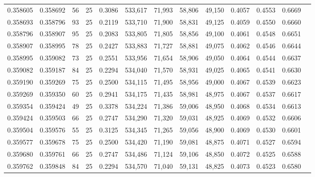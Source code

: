 \begin{tabular}{rrrrrrrrrrrrr}
0.358605 & 0.358692 &    56 &  25 &                                     0.3086 & 533,617 &  71,993 &  58,806 &  49,150 & 0.4057 & 0.4553 & 0.6669 \\
0.358693 & 0.358796 &    93 &  25 &                                     0.2119 & 533,710 &  71,900 &  58,831 &  49,125 & 0.4059 & 0.4550 & 0.6660 \\
0.358796 & 0.358907 &    95 &  25 &                                     0.2083 & 533,805 &  71,805 &  58,856 &  49,100 & 0.4061 & 0.4548 & 0.6651 \\
0.358907 & 0.358995 &    78 &  25 &                                     0.2427 & 533,883 &  71,727 &  58,881 &  49,075 & 0.4062 & 0.4546 & 0.6644 \\
0.358995 & 0.359082 &    73 &  25 &                                     0.2551 & 533,956 &  71,654 &  58,906 &  49,050 & 0.4064 & 0.4544 & 0.6637 \\
0.359082 & 0.359187 &    84 &  25 &                                     0.2294 & 534,040 &  71,570 &  58,931 &  49,025 & 0.4065 & 0.4541 & 0.6630 \\
0.359190 & 0.359269 &    75 &  25 &                                     0.2500 & 534,115 &  71,495 &  58,956 &  49,000 & 0.4067 & 0.4539 & 0.6623 \\
0.359269 & 0.359350 &    60 &  25 &                                     0.2941 & 534,175 &  71,435 &  58,981 &  48,975 & 0.4067 & 0.4537 & 0.6617 \\
0.359354 & 0.359424 &    49 &  25 &                                     0.3378 & 534,224 &  71,386 &  59,006 &  48,950 & 0.4068 & 0.4534 & 0.6613 \\
0.359424 & 0.359503 &    66 &  25 &                                     0.2747 & 534,290 &  71,320 &  59,031 &  48,925 & 0.4069 & 0.4532 & 0.6606 \\
0.359504 & 0.359576 &    55 &  25 &                                     0.3125 & 534,345 &  71,265 &  59,056 &  48,900 & 0.4069 & 0.4530 & 0.6601 \\
0.359577 & 0.359678 &    75 &  25 &                                     0.2500 & 534,420 &  71,190 &  59,081 &  48,875 & 0.4071 & 0.4527 & 0.6594 \\
0.359680 & 0.359761 &    66 &  25 &                                     0.2747 & 534,486 &  71,124 &  59,106 &  48,850 & 0.4072 & 0.4525 & 0.6588 \\
0.359762 & 0.359848 &    84 &  25 &                                     0.2294 & 534,570 &  71,040 &  59,131 &  48,825 & 0.4073 & 0.4523 & 0.6580 \\

\end{tabular}
